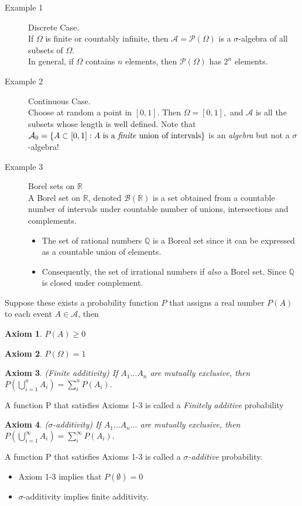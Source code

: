 \documentclass[12pt]{report} \addtolength{\textheight}{2in}
\newtheorem{axiom}{Axiom}
\newcommand{\rational}{\mathbb{Q}}
\newcommand{\Borel}{\mathscr{B}}
\newcommand{\Realnum}{\mathbb{R}}
\newcommand{\bigA}{\mathcal{A}}
\newcommand{\finU}{ \bigcup_{i=1}^{n}}
\newcommand{\infU}{ \bigcup_{i=1}^{\infty}}
\begin{document}
\begin{description}
\item[Example 1] 
Discrete Case. \\
If $\Omega$ is finite or countably infinite, then $\bigA = \mathcal{P}(\Omega)$ is a $\sigma$-algebra of all subsets of $\Omega$. \\
In general, if $\Omega$ contains $n$ elements, then $\mathcal{P}(\Omega)$ has $2^{n}$ elements. 
\item[Example 2] Continuous Case.\\
Choose at random a point in $[0,1].$ Then $\Omega=[0,1],$ and $\bigA$ is all the subsets whose length is well defined. Note that $\bigA_0=\{A\subset [0,1]: \text{$A$ is a \textit{finite} union of intervals} \}$ is an \textit{algebra} but not a $\sigma$-algebra!
\item[Example 3] Borel sets on $\Realnum$\\
A Borel set on $\Realnum$, denoted $\Borel(\Realnum)$ is a set obtained from a countable number of intervals under countable number of unions, intersections and complements.
\begin{itemize}
\item The set of rational numbers $\rational$ is a Boreal set since it can be expressed as a countable union of elements. 
\item Consequently, the set of irrational numbers if \textit{also} a Borel set. Since $\rational$ is closed under complement.
\end{itemize}
\end{description}
\newpage
Suppose these exists a probability function $P$ that assigns a real number $P(A)$ to each event $A\in \bigA$, then
\begin{axiom}$P(A) \geq 0$
\end{axiom}
\begin{axiom}$P(\Omega) = 1$
\end{axiom}
\begin{axiom}(Finite additivity) If $A_1 \dots A_n$ are mutually exclusive, then $P(\finU A_i) =\sum_{i}^{n} P(A_i).$
\end{axiom}
A function P that satisfies Axioms 1-3 is called a \textit{Finitely additive} probability
\begin{axiom}
($\sigma$-additivity) If $A_1 \dots A_n\dots $ are mutually exclusive, then $P(\infU A_i) =\sum_{i}^{\infty} P(A_i).$
\end{axiom}
A function P that satisfies Axioms 1-3 is called a \textit{$\sigma$-additive} probability.
\begin{itemize}
\item Axiom 1-3 implies that $P(\emptyset)=0$
\item $\sigma$-additivity implies finite additivity.
\end{itemize}
\end{document}
